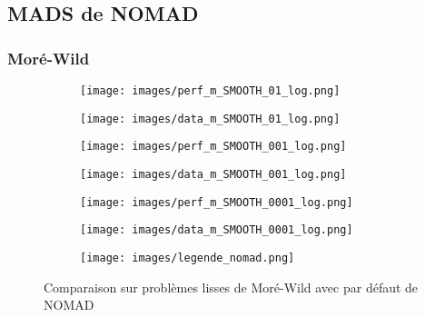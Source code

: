 	\subsection{MADS de NOMAD}
		\subsubsection{Moré-Wild}
		\begin{figure}[!htb] %
			\centering
			\begin{subfigure}{0.43\textwidth}
				\texttt{[image: images/perf\_m\_SMOOTH\_01\_log.png]}
			\end{subfigure}%
			\begin{subfigure}{0.43\textwidth}
				\texttt{[image: images/data\_m\_SMOOTH\_01\_log.png]}
			\end{subfigure}
			\smallskip
			\begin{subfigure}{0.43\textwidth}
				\texttt{[image: images/perf\_m\_SMOOTH\_001\_log.png]}
			\end{subfigure}%
			\begin{subfigure}{0.43\textwidth}
				\texttt{[image: images/data\_m\_SMOOTH\_001\_log.png]}
			\end{subfigure}
			\smallskip
			\begin{subfigure}{0.43\textwidth}
				\texttt{[image: images/perf\_m\_SMOOTH\_0001\_log.png]}
			\end{subfigure}%
			\begin{subfigure}{0.43\textwidth}
				\texttt{[image: images/data\_m\_SMOOTH\_0001\_log.png]}
			\end{subfigure}
			\smallskip
			\begin{subfigure}{0.95\textwidth}
				\texttt{[image: images/legende\_nomad.png]}
			\end{subfigure}
			\caption{Comparaison sur problèmes lisses de Moré-Wild avec \MADS par défaut de NOMAD} \label{fig:1}
		\end{figure}
		\clearpage
